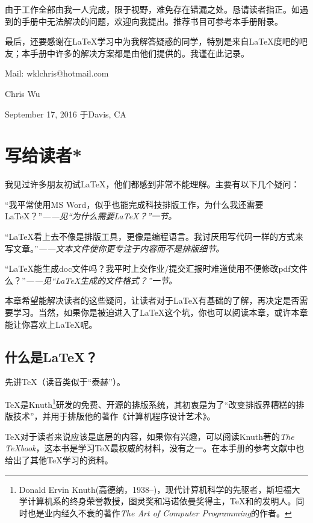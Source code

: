 由于工作全部由我一人完成，限于视野，难免存在错漏之处。恳请读者指正。如遇到的手册中无法解决的问题，欢迎向我提出。推荐书目可参考本手册附录。

最后，还要感谢在\LaTeX 学习中为我解答疑惑的同学，特别是来自\LaTeX 度吧的吧友；本手册中许多的解决方案都是由他们提供的。我谨在此记录。

\vfill

\begin{flushright}
Mail: wklchris@hotmail.com\dpar

Chris Wu

September 17, 2016 于Davis, CA
\end{flushright}

\chapter{\mbox{写给读者}*}

我见过许多朋友初试\LaTeX ，他们都感到非常不能理解。主要有以下几个疑问：
\begin{feae}
\item “我平常使用MS Word，似乎也能完成科技排版工作，为什么我还需要\LaTeX ？”\hfill \textit{——见“为什么需要\LaTeX ？”一节。}
\item “\LaTeX 看上去不像是排版工具，更像是编程语言。我讨厌用写代码一样的方式来写文章。”\hfill \textit{——文本文件使你更专注于内容而不是排版细节。}
\item “\LaTeX 能生成doc文件吗？我平时上交作业/提交汇报时难道使用不便修改pdf文件么？”\hfill \textit{——见“\LaTeX 生成的文件格式？”一节。}
\end{feae}

本章希望能解决读者的这些疑问，让读者对于\LaTeX 有基础的了解，再决定是否需要学习。当然，如果你是被迫进入了\LaTeX 这个坑，你也可以阅读本章，或许本章能让你喜欢上\LaTeX 呢。

\section{什么是\LaTeX ？}
先讲\TeX （读音类似于“泰赫”）。

\TeX 是Knuth\footnote{Donald Ervin Knuth(高德纳，1938--)，现代计算机科学的先驱者，斯坦福大学计算机系的终身荣誉教授，图灵奖和冯诺依曼奖得主，\TeX 和的发明人。同时也是业内经久不衰的著作\emph{The Art of Computer Programming}的作者。}研发的免费、开源的排版系统，其初衷是为了“改变排版界糟糕的排版技术”，并用于排版他的著作《计算机程序设计艺术》。

\TeX 对于读者来说应该是底层的内容，如果你有兴趣，可以阅读Knuth著的\emph{The \TeX book}，这本书是学习\TeX 最权威的材料，没有之一。在本手册的参考文献中也给出了其他\TeX 学习的资料。\dpar

